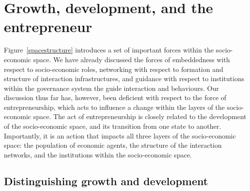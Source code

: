 \section{Growth, development, and the entrepreneur}
\label{sec:GrowthDevelopment}

Figure~\ref{spacestructure} introduces a set of important forces within the socio-economic space. We have already discussed the forces of embeddedness with respect to socio-economic roles, networking with respect to formation and structure of interaction infrastructures, and guidance with respect to institutions within the governance system the guide interaction and behaviours. Our discussion thus far has, however, been deficient with respect to the force of entrepreneurship, which acts to influence a change within the layers of the socio-economic space. The act of entrepreneurship is closely related to the development of the socio-economic space, and its transition from one state to another. Importantly, it is an action that impacts all three layers of the socio-economic space: the population of economic agents, the structure of the interaction networks, and the institutions within the socio-economic space.

\subsection{Distinguishing growth and development}

